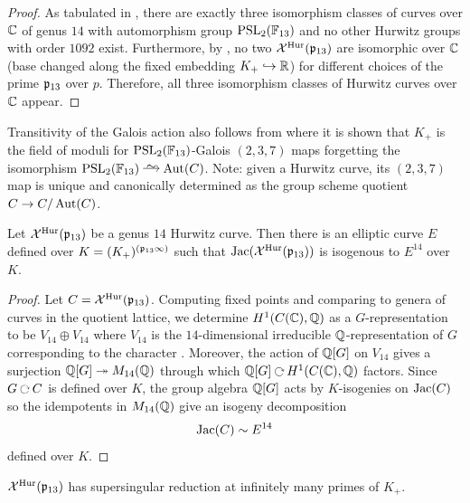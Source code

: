 \documentclass[main.tex]{subfiles}
\begin{document}
\begin{proof}
As tabulated in \cite{lmfdb:hgcwa-14.1092-25.0.2-3-7}, there are exactly three isomorphism classes of curves over $\mathbb{C}$ of genus $14$ with automorphism group $\mathrm{PSL}_2(\mathbb{F}_{13})$ and no other Hurwitz groups with order $1092$ exist. Furthermore, by \cite[3.19.2]{shimura:curves}, no two $\mathcal{X}^{\mathrm{Hur}}(\mathfrak{p}_{13})$ are isomorphic over $\mathbb{C}$ (base changed along the fixed embedding $K_+ \hookrightarrow \mathbb{R}$) for different choices of the prime $\mathfrak{p}_{13}$ over $p$. Therefore, all three isomorphism classes of Hurwitz curves over $\mathbb{C}$ appear.
\end{proof}

\begin{rmk}
Transitivity of the Galois action also follows from \cite[Theorem B (b)]{voight:triangle_groups} where it is shown that $K_+$ is the field of moduli for $\mathrm{PSL}_2(\mathbb{F}_{13})$-Galois $(2,3,7)$ \Belyi maps forgetting the isomorphism $\PSL_2(\FF_{13}) \iso \Aut(C)$. Note: given a Hurwitz curve, its $(2,3,7)$ \Belyi map is unique and canonically determined as the group scheme quotient $C \to C / \operatorname{\mathrm{Aut}}(C)$.
\end{rmk}


\begin{theorem} \label{app:thm:isogeny_decomp_defined_over_K}
Let $\mathcal{X}^{\mathrm{Hur}}(\mathfrak{p}_{13})$ be a genus $14$ Hurwitz curve. Then there is an elliptic curve $E$ defined over $K = (K_+)^{(\mathfrak{p}_{13}\infty)}$ such that $\operatorname{\mathrm{Jac}}(\mathcal{X}^{\mathrm{Hur}}(\mathfrak{p}_{13}))$ is isogenous to $E^{14}$ over $K$.
\end{theorem}

\begin{proof}
Let $C = \mathcal{X}^{\mathrm{Hur}}(\mathfrak{p}_{13})$. Computing fixed points and comparing to genera of curves in the quotient lattice, we determine $H^1(C(\mathbb{C}), \mathbb{Q})$ as a $G$-representation to be $V_{14} \oplus V_{14}$ where $V_{14}$ is the $14$-dimensional irreducible $\mathbb{Q}$-representation of $G$ corresponding to the character \cite{lmfdb:grp-1092.25.14b}. Moreover, the action of $\mathbb{Q}[G]$ on $V_{14}$ gives a surjection $\mathbb{Q}[G] \twoheadrightarrow M_{14}(\mathbb{Q})$ through which $\Q[G] \acts H^1(C(\CC), \Q)$ factors. Since $G \acts C$ is defined over $K$, the group algebra $\mathbb{Q}[G]$ acts by $K$-isogenies on $\operatorname{\mathrm{Jac}}(C)$ so the idempotents in $M_{14}(\mathbb{Q})$ give an isogeny decomposition
\[ \operatorname{\mathrm{Jac}}(C) \sim E^{14} \]
defined over $K$.
\end{proof}

\begin{cor} \label{app:cor:supersingular_reduction}
$\mathcal{X}^{\mathrm{Hur}}(\mathfrak{p}_{13})$ has supersingular reduction at infinitely many primes of $K_+$.
\end{cor}
\end{document}

